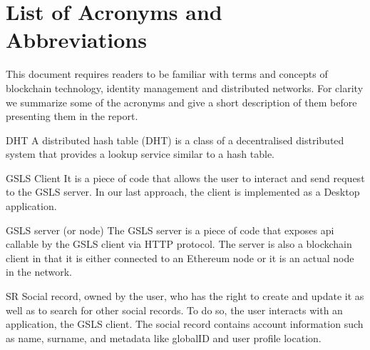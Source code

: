 \documentclass[12pt,twoside]{article}
\begin{document}
\tableofcontents

\section*{List of Acronyms and Abbreviations}
\label{list-of-acronyms-and-abbreviations}

This document requires readers to be familiar with terms and concepts of blockchain technology, identity management and distributed networks. For clarity we summarize some of the acronyms and give a short description of them before presenting them in the report.


\begin{basedescript}{\desclabelstyle{\pushlabel}\desclabelwidth{10em}}
    \item[DHT]                      A distributed hash table (DHT) is a class of a decentralised distributed system that provides a lookup service similar to a hash table.
    \item[GSLS Client]              It is a piece of code that allows the user to interact and send request to the GSLS server. In our last approach, the client is implemented as a Desktop application.
    \item[GSLS server (or node)]    The GSLS server is a piece of code that exposes api callable by the GSLS client via HTTP protocol. The server is also a blockchain client in that it is either connected to an Ethereum node or it is an actual node in the network.
    \item[SR]                       Social record, owned by the user, who has the right to create and update it as well as to search for other social records. To do so, the user interacts with an application, the GSLS client. The social record contains account information such as name, surname, and metadata like globalID and user profile location.
\end{basedescript}

\clearpage



% 


\appendix

\end{document}
